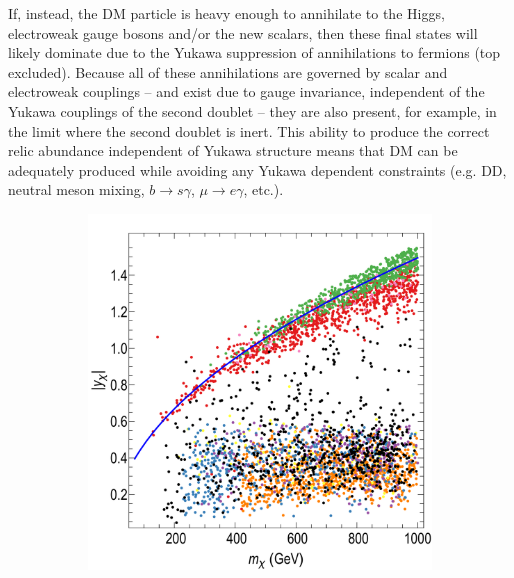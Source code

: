 If, instead, the DM particle is heavy enough to annihilate to the Higgs,
electroweak gauge bosons and/or the new scalars, then these final states will
likely dominate due to the Yukawa suppression of annihilations to fermions 
(top excluded).
Because all of these annihilations are governed by scalar and electroweak
couplings -- and exist due to gauge invariance, independent of the
Yukawa couplings of the second doublet -- they are also present,
for example, in the limit where the second doublet is inert.
This ability to produce the correct relic abundance independent of
Yukawa structure means that DM can be adequately produced while
avoiding any Yukawa dependent constraints (e.g. DD, neutral meson
mixing, $b \to s \gamma$, $\mu \to e \gamma$, etc.).

\begin{figure}[t]
\centering
\begin{subfigure}[t]{0.43\textwidth}
\includegraphics[width=\textwidth]{texinputs/05_relic/figures/relic_scalar/mDM_yDM4.pdf}
\label{fig:scan1a}
\end{subfigure}
\hspace{1em}
\begin{subfigure}[t]{0.43\textwidth}

\end{subfigure}
\end{figure}
